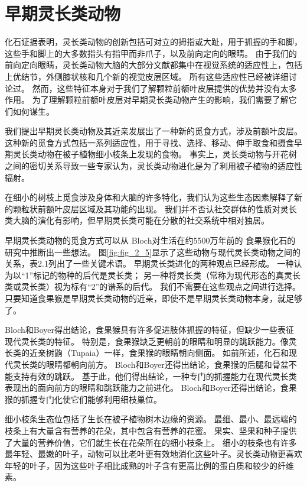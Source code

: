 \section{早期灵长类动物}
化石证据表明，灵长类动物的创新包括可对立的拇指或大趾，用于抓握的手和脚，这些手和脚上的大多数指头有指甲而非爪子，以及前向定向的眼睛\cite{fleagle2013primate,rose2006beginning}。
由于我们的前向定向眼睛，灵长类动物大脑的大部分文献都集中在视觉系统的适应性上，包括上优结节，外侧膝状核和几个新的视觉皮层区域。
所有这些适应性已经被详细讨论过\cite{barton2004binocularity,kaas2020evolution,preuss2007evolutionary}。
然而，这些特征本身对于我们了解颗粒前额叶皮层提供的优势并没有太多作用。
为了理解颗粒前额叶皮层对早期灵长类动物产生的影响，我们需要了解它们如何谋生。


我们提出早期灵长类动物及其近亲发展出了一种新的觅食方式，涉及前额叶皮层。
这种新的觅食方式包括一系列适应性，用于寻找、选择、移动、伸手取食和摄食早期灵长类动物在被子植物细小枝条上发现的食物。
事实上，灵长类动物与开花树之间的密切关系导致一些专家认为，灵长类动物进化是为了利用被子植物的适应性辐射。


在细小的树枝上觅食涉及身体和大脑的许多特化，我们认为这些生态因素解释了新的颗粒状前额叶皮层区域及其功能的出现。
我们并不否认社交群体的性质对灵长类大脑的演化有影响\cite{dunbar2009social}，但早期灵长类可能在分散的社交系统中相对独居\cite{mueller2000origin}。


早期灵长类动物的觅食方式可以从 Bloch\cite{bloch2002grasping}对生活在约5500万年前的 食果猴化石的研究中推断出一些想法。
图\ref{fig:fig_2_5}显示了这些动物与现代灵长类动物之间的关系，表2.1列出了一些关键术语。
早期灵长类进化的两种观点已经形成。
一种认为以“1”标记的物种的后代是灵长类；
另一种将灵长类（常称为现代形态的真灵长类或灵长类）视为标有“2”的谱系的后代。
我们不需要在这些观点之间进行选择。只要知道食果猴是早期灵长类动物的近亲，即使不是早期灵长类动物本身，就足够了。


Bloch和Boyer得出结论，食果猴具有许多促进肢体抓握的特征，但缺少一些表征现代灵长类的特征。
特别是，食果猴缺乏更朝前的眼睛和明显的跳跃能力。像灵长类的近亲树鼩（Tupaia）一样，食果猴的眼睛朝向侧面。
如前所述，化石和现代灵长类的眼睛都朝向前方。
Bloch和Boyer还得出结论，食果猴的后腿和骨盆不能支持有效的跳跃。
基于此，他们得出结论，一种专门的抓握能力在现代灵长类表现出的面向前方的眼睛和跳跃能力之前进化。
Bloch和Boyer还得出结论，食果猴的抓握专门化使它们能够利用细枝巢位。


细小枝条生态位包括了生长在被子植物树木边缘的资源。
最细、最小、最远端的枝条上有大量含有营养的花朵，其中包含有营养的花蜜。
果实、坚果和种子提供了大量的营养价值，它们就生长在花朵所在的细小枝条上。
细小的枝条也有许多最年轻、最嫩的叶子，动物可以比老叶更有效地消化这些叶子。灵长类动物更喜欢年轻的叶子，因为这些叶子相比成熟的叶子含有更高比例的蛋白质和较少的纤维素。


